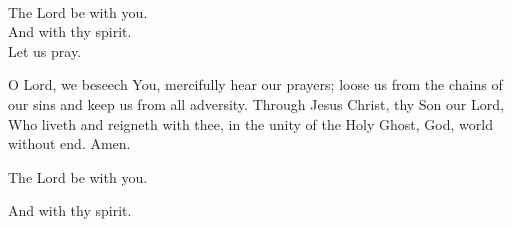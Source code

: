 \\
  \rubric{\Vbar}The Lord be with you.
\\
  \rubric{\Rbar}And with thy spirit.
\\
Let us pray.

O Lord, we beseech You, mercifully hear our prayers; loose us from the chains of our sins and keep us from all adversity. Through Jesus Christ, thy Son our Lord, Who liveth and reigneth with thee, in the unity of the Holy Ghost, God, world without end.\rubric{\Rbar} Amen.

  \rubric{\Vbar}The Lord be with you.

  \rubric{\Rbar}And with thy spirit.
